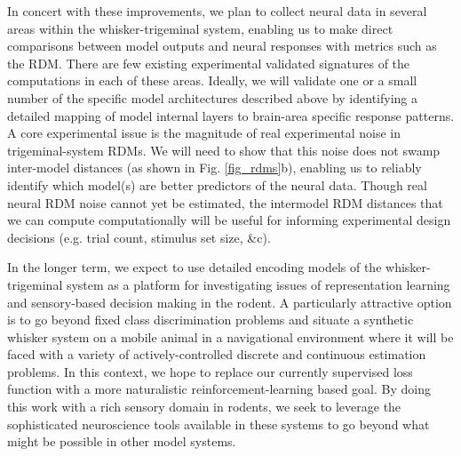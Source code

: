 In concert with these improvements, we plan to collect neural data in several areas within the whisker-trigeminal system, enabling us to make direct comparisons between model outputs and neural responses with metrics such as the RDM.  
There are few existing experimental validated signatures of the computations in each of these areas.  Ideally, we will validate one or a small number of the specific model architectures described above by identifying a detailed mapping of model internal layers to brain-area specific response patterns.
A core experimental issue is the magnitude of real experimental noise in trigeminal-system RDMs. 
We will need to show that this noise does not swamp inter-model distances (as shown in Fig. \ref{fig_rdms}b), enabling us to reliably identify which model(s) are better predictors of the neural data.
Though real neural RDM noise cannot yet be estimated, the inter­model RDM distances that we can compute computationally will be useful for informing experimental design decisions (e.g. trial count, stimulus set size, &c).

In the longer term, we expect to use detailed encoding models of the whisker-trigeminal system as a platform for investigating issues of representation learning and sensory-based decision making in the rodent. 
A particularly attractive option is to go beyond fixed class discrimination problems and situate a synthetic whisker system on a mobile animal in a navigational environment where it will be faced with a variety of actively-controlled discrete and continuous estimation problems.
In this context, we hope to replace our currently supervised loss function with a more naturalistic reinforcement-learning based goal.
By doing this work with a rich sensory domain in rodents, we seek to leverage the sophisticated neuroscience tools available in these systems to go beyond what might be possible in other model systems.  

